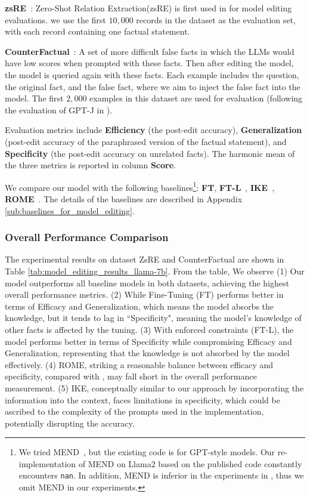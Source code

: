 \textbf{zsRE}~\citep{zsre}: Zero-Shot Relation Extraction(zsRE) is first used in \citet{mend, KE} for model editing evaluations.  we use the first $10,000$ records in the dataset as the evaluation set, with each record containing one factual statement. 

\textbf{CounterFactual}~\citep{ROME}: A set of more difficult false facts in which the LLMs would have low scores when prompted with these facts. Then after editing the model, the model is queried again with these facts. Each example includes the question, the original fact, and the false fact, where we aim to inject the false fact into the model. The first $2,000$ examples in this dataset are used for evaluation (following the evaluation of GPT-J in \cite{ROME}). 

Evaluation metrics include \textbf{Efficiency} (the post-edit accuracy), \textbf{Generalization} (post-edit accuracy of the paraphrased version of the factual statement), and \textbf{Specificity} (the post-edit accuracy on unrelated facts). The harmonic mean of the three metrics is reported in column \textbf{ Score}. 

We compare our model with the following baselines\footnote{We tried MEND~\citep{mend}, but the existing code is for GPT-style models. Our re-implementation of MEND on Llama2 based on the published code constantly encounters \texttt{nan}. In addition, MEND is inferior in the experiments in \cite{ROME}, thus we omit MEND in our experiments. }:
\textbf{FT}, \textbf{FT-L}~\citep{ModifyingMemories}, \textbf{IKE}~\citep{ike}, \textbf{ROME}~\citep{ROME}. The details of the baselines are described in Appendix \ref{sub:baselines_for_model_editing}. 







\vspace{-5pt}
\subsubsection{Overall Performance Comparison}
The experimental results on dataset ZsRE and CounterFactual are shown in
Table \ref{tab:model_editing_results_llama-7b}. From the table, 
We observe (1) 
Our model outperforms all baseline models in both datasets, achieving the highest overall performance metrics. 
(2) While Fine-Tuning (FT) 
performs better in terms of Efficacy and Generalization, which means the model absorbs the knowledge, but it tends to lag in ``Specificity", meaning the model's knowledge of other facts is affected by the tuning.
(3) With enforced constraints (FT-L), 
the model performs better in terms of Specificity while compromising Efficacy and Generalization, representing that the knowledge is not absorbed by the model effectively.
(4) ROME, striking a reasonable balance between efficacy and specificity, compared with \ours, may fall short in the overall performance measurement. 
(5) IKE, conceptually similar to our approach by incorporating the information into the context, faces limitations in specificity, which could be ascribed to the complexity of the prompts used in the implementation, potentially disrupting the accuracy. 


